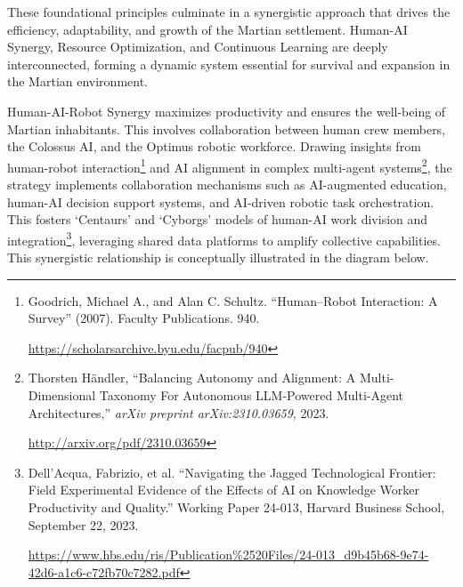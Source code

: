 \documentclass[fontsize=10pt, oneside, DIV=calc]{scrartcl}
\begin{document}


\medskip

\noindent
These foundational principles culminate in a synergistic approach that drives the efficiency, adaptability, and growth of the Martian settlement. Human-AI Synergy, Resource Optimization, and Continuous Learning are deeply interconnected, forming a dynamic system essential for survival and expansion in the Martian environment.

\medskip

\noindent
Human-AI-Robot Synergy maximizes productivity and ensures the well-being of Martian inhabitants. This involves collaboration between human crew members, the Colossus AI, and the Optimus robotic workforce. Drawing insights from human-robot interaction\footnote{Goodrich, Michael A., and Alan C. Schultz. ``Human–Robot Interaction: A Survey'' (2007). Faculty Publications. 940. 











\href{https://scholarsarchive.byu.edu/facpub/940}\url{https://scholarsarchive.byu.edu/facpub/940}} and AI alignment in complex multi-agent systems\footnote{Thorsten Händler, ``Balancing Autonomy and Alignment: A Multi-Dimensional Taxonomy For Autonomous LLM-Powered Multi-Agent Architectures,'' \textit{arXiv preprint arXiv:2310.03659}, 2023. 











\href{http://arxiv.org/pdf/2310.03659}\url{http://arxiv.org/pdf/2310.03659}}, the strategy implements collaboration mechanisms such as AI-augmented education, human-AI decision support systems, and AI-driven robotic task orchestration. This fosters `Centaurs' and `Cyborgs' models of human-AI work division and integration\footnote{Dell’Acqua, Fabrizio, et al. ``Navigating the Jagged Technological Frontier: Field Experimental Evidence of the Effects of AI on Knowledge Worker Productivity and Quality.'' Working Paper 24-013, Harvard Business School, September 22, 2023. 











\href{https://www.hbs.edu/ris/Publication\%2520Files/24-013\_d9b45b68-9e74-42d6-a1c6-c72fb70c7282.pdf}\url{https://www.hbs.edu/ris/Publication\%2520Files/24-013\_d9b45b68-9e74-42d6-a1c6-c72fb70c7282.pdf}}, leveraging shared data platforms to amplify collective capabilities. This synergistic relationship is conceptually illustrated in the diagram below.
\end{document}
